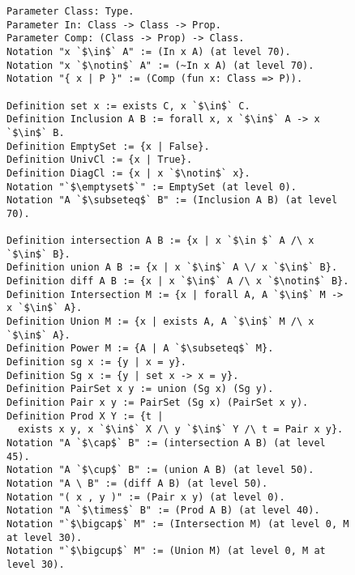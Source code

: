 \begin{figure}
\begin{lstlisting}[language=Coq, xleftmargin=\mathindent, escapechar=`,
label=lst:MK-Definitionen, caption={Begrifflichkeiten der Mengenlehre}]
Parameter Class: Type.
Parameter In: Class -> Class -> Prop.
Parameter Comp: (Class -> Prop) -> Class.
Notation "x `$\in$` A" := (In x A) (at level 70).
Notation "x `$\notin$` A" := (~In x A) (at level 70).
Notation "{ x | P }" := (Comp (fun x: Class => P)).

Definition set x := exists C, x `$\in$` C.
Definition Inclusion A B := forall x, x `$\in$` A -> x `$\in$` B.
Definition EmptySet := {x | False}.
Definition UnivCl := {x | True}.
Definition DiagCl := {x | x `$\notin$` x}.
Notation "`$\emptyset$`" := EmptySet (at level 0).
Notation "A `$\subseteq$` B" := (Inclusion A B) (at level 70).

Definition intersection A B := {x | x `$\in $` A /\ x `$\in$` B}.
Definition union A B := {x | x `$\in$` A \/ x `$\in$` B}.
Definition diff A B := {x | x `$\in$` A /\ x `$\notin$` B}.
Definition Intersection M := {x | forall A, A `$\in$` M -> x `$\in$` A}.
Definition Union M := {x | exists A, A `$\in$` M /\ x `$\in$` A}.
Definition Power M := {A | A `$\subseteq$` M}.
Definition sg x := {y | x = y}.
Definition Sg x := {y | set x -> x = y}.
Definition PairSet x y := union (Sg x) (Sg y).
Definition Pair x y := PairSet (Sg x) (PairSet x y).
Definition Prod X Y := {t |
  exists x y, x `$\in$` X /\ y `$\in$` Y /\ t = Pair x y}.
Notation "A `$\cap$` B" := (intersection A B) (at level 45).
Notation "A `$\cup$` B" := (union A B) (at level 50).
Notation "A \ B" := (diff A B) (at level 50).
Notation "( x , y )" := (Pair x y) (at level 0).
Notation "A `$\times$` B" := (Prod A B) (at level 40).
Notation "`$\bigcap$` M" := (Intersection M) (at level 0, M at level 30).
Notation "`$\bigcup$` M" := (Union M) (at level 0, M at level 30).
\end{lstlisting}
\end{figure}

